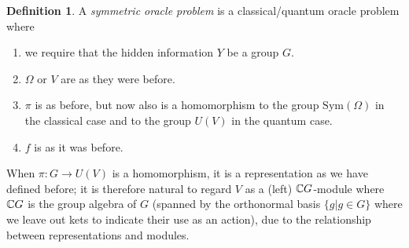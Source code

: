 \documentclass[12pt,twoside]{reedthesis}
\theoremstyle{plain}   %
\theoremstyle{definition}
\newtheorem{defn}{Definition}[section]
\theoremstyle{remark}
\numberwithin{equation}{section}
\def\Sym{\mathrm{Sym}}
\begin{document}
  \begin{defn}
    A \emph{symmetric oracle problem} is a classical/quantum oracle problem where
    \begin{enumerate}
    \item we require that the hidden information $Y$ be a group $G$.
    \item $\Omega$ or $V$ are as they were before.
    \item $\pi$ is as before, but now also is a homomorphism to the group $\Sym(\Omega)$ in the classical case and to the group $U(V)$ in the quantum case.
    \item $f$ is as it was before.
    \end{enumerate}
    When $\pi: G \to U(V)$ is a homomorphism, it is a representation as we have defined before;
    it is therefore natural to regard $V$ as a (left) $\mathbb{C} G$-module where $\mathbb{C} G$ is the group algebra of $G$ (spanned by the orthonormal basis $\{g | g \in G\}$ where we leave out kets to indicate their use as an action),
    due to the relationship between representations and modules.
  \end{defn}
\end{document}
